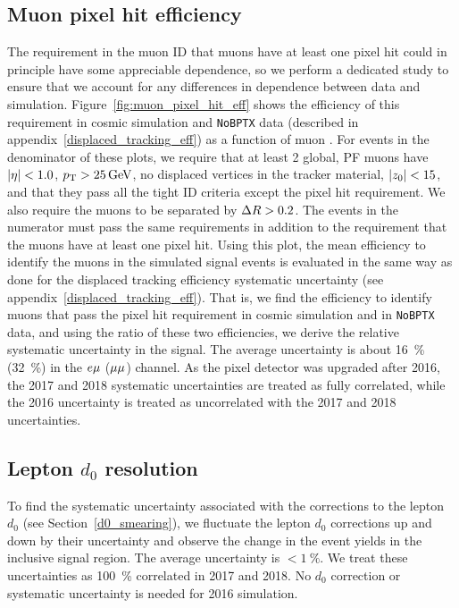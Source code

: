 \subsection{Muon pixel hit efficiency}
The requirement in the muon ID that muons have at least one pixel hit could in principle have some appreciable \ad dependence, so we perform a dedicated study to ensure that we account for any differences in \ad dependence between data and simulation. Figure~\ref{fig:muon_pixel_hit_eff} shows the efficiency of this requirement in cosmic simulation and \texttt{NoBPTX} data (described in appendix~\ref{displaced_tracking_eff}) as a function of muon \ad. For events in the denominator of these plots, we require  that at least 2 global, PF muons have $\lvert \eta \rvert<1.0$, $\pt>\SI{25}{\GeV}$, no displaced vertices in the tracker material, $\az<15\unit{cm}$, and that they pass all the tight ID criteria except the pixel hit requirement. We also require the muons to be separated by $\Delta R>0.2$. The events in the numerator must pass the same requirements in addition to the requirement that the muons have at least one pixel hit. Using this plot, the mean efficiency to identify the muons in the simulated signal events is evaluated in the same way as done for the displaced tracking efficiency systematic uncertainty (see  appendix~\ref{displaced_tracking_eff}). That is, we find the efficiency to identify muons that pass the pixel hit requirement in cosmic simulation and in \texttt{NoBPTX} data, and using the ratio of these two efficiencies, we derive the relative systematic uncertainty in the signal. The average uncertainty is about \SI{16}{\percent} (\SI{32}{\percent}) in the $e{\mu}$ (${\mu}{\mu}$) channel. As the pixel detector was upgraded after 2016, the 2017 and 2018 systematic uncertainties are treated as fully correlated, while the 2016 uncertainty is treated as uncorrelated with the 2017 and 2018 uncertainties.



\subsection{Lepton $d_0$ resolution}
To find the systematic uncertainty associated with the corrections to the lepton $d_0$ (see Section~\ref{d0_smearing}), we fluctuate the lepton $d_0$ corrections up and down by their uncertainty and observe the change in the event yields in the inclusive signal region. The average uncertainty is $<\SI{1}{\percent}$. We treat these uncertainties as \SI{100}{\percent} correlated in 2017 and 2018. No $d_0$ correction or systematic uncertainty is needed for 2016 simulation.

\pagebreak